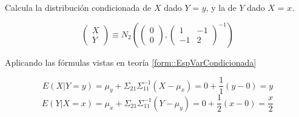 \begin{problem}[2]

\solution

\end{problem}

\begin{problem}[3]


\solution

\end{problem}

\begin{problem}[5]

Calcula la distribución condicionada de $X$ dado $Y$ = $y$, y la de $Y$ dado $X$ = $x$.

\solution


\[
\begin{pmatrix}X\\Y \end{pmatrix} \equiv N_2\left(\begin{pmatrix}0\\0\end{pmatrix},\begin{pmatrix}1&-1\\-1&2\end{pmatrix}^{-1}\right)
\]

Aplicando las fórmulas vistas en teoría \ref{form::EspVarCondicionada}

\[
E(X|Y=y) = μ_y + Σ_{21}Σ_{11}^{-1}(X-μ_x) = 0 + \frac{1}{1}(y-0) = y
\]
\[
E(Y|X=x) = μ_x + Σ_{21}Σ_{11}^{-1}(Y-μ_y) = 0 + \frac{1}{2}(x-0) = \frac{x}{2}
\]

\end{problem}

